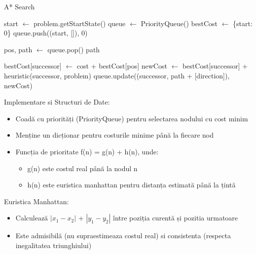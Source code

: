 \begin{algorithm}
\caption{A* Search}
\begin{algorithmic}[1]
    \State start $\gets$ problem.getStartState()
    \State queue $\gets$ PriorityQueue()
    \State bestCost $\gets$ \{start: 0\}
    \State queue.push((start, []), 0)
    
        \State pos, path $\gets$ queue.pop()
            \Return path
        \EndIf
        
                \State bestCost[successor] $\gets$ cost + bestCost[pos]
                \State newCost $\gets$ bestCost[successor] + heuristic(successor, problem)
                \State queue.update((successor, path + [direction]), newCost)
            \EndIf
        \EndFor
    \EndWhile \\
	\Return [ ]
\EndFunction
\end{algorithmic}
\end{algorithm}

\par Implementare si Structuri de Date:
\begin {itemize}
	\item Coadă cu priorități (PriorityQueue) pentru selectarea nodului cu cost minim
	\item Menține un dicționar pentru costurile minime până la fiecare nod
	\item Funcția de prioritate f(n) = g(n) + h(n), unde:
	\begin {itemize}
		\item g(n) este costul real până la nodul n
		\item h(n) este euristica manhattan pentru distanța estimată până la țintă
	\end {itemize}
\end {itemize} 

\par Euristica Manhattan:

\begin {itemize}
	\item Calculează $|x_1-x_2|$ + $|y_1-y_2|$ între poziția curentă și pozitia urmatoare
	\item Este admisibilă (nu supraestimeaza costul real) si consistenta (respecta inegalitatea triunghiului)
\end {itemize}

